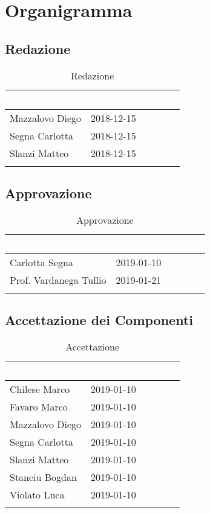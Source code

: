 \section{Organigramma}
\label{Organigramma}


\subsection{Redazione}

\begin{longtable}{|C{.25\textwidth}|C{.16\textwidth}|C{.45\textwidth}|}
\hline
{}\textbf{\textcolor{white}{Nome}} & \textbf{\textcolor{white}{Data}} & \textbf{\textcolor{white}{Firma}}\\
\hline \hline
\endfirsthead
Mazzalovo Diego & 2018-12-15 &  \\
\hline
{}Segna Carlotta & 2018-12-15 & \\
\hline
Slanzi Matteo & 2018-12-15 & \\
\hline
\caption{Redazione}
\label{Tabella Redazione}
\end{longtable}


\subsection{Approvazione}

\begin{longtable}{|C{.25\textwidth}|C{.16\textwidth}|C{.45\textwidth}|}
\hline
{}\textbf{\textcolor{white}{Nome}} & \textbf{\textcolor{white}{Data}} & \textbf{\textcolor{white}{Firma}}\\
\hline \hline
\endfirsthead
Carlotta Segna & 2019-01-10 &  \\
\hline
{}Prof. Vardanega Tullio & 2019-01-21 & \\
\hline
\caption{Approvazione}
\label{Tabella Approvazione}
\end{longtable}

\subsection{Accettazione dei Componenti}

\begin{longtable}{|C{.25\textwidth}|C{.16\textwidth}|C{.45\textwidth}|}
\hline
{}\textbf{\textcolor{white}{Nome}} & \textbf{\textcolor{white}{Data}} & \textbf{\textcolor{white}{Firma}}\\
\hline \hline
\endfirsthead
Chilese Marco & 2019-01-10 &  \\
\hline
{}Favaro Marco & 2019-01-10 &  \\
\hline
Mazzalovo Diego & 2019-01-10 &  \\
\hline
{}Segna Carlotta & 2019-01-10 &  \\
\hline
Slanzi Matteo & 2019-01-10 &  \\
\hline
{}Stanciu Bogdan & 2019-01-10 &  \\
\hline
Violato Luca & 2019-01-10 & \\
\hline
\caption{Accettazione}
\label{Tabella Accettazione}
\end{longtable}

